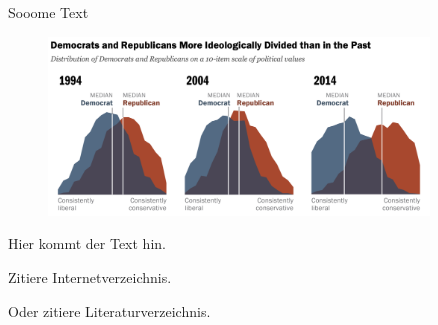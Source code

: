Sooome Text

	\begin{figure}[ht]
		\centering
		\includegraphics[width=0.9\textwidth]{images/Kapitel1/PoliticalPolarization}
	\end{figure}
	


Hier kommt der Text hin.

Zitiere  Internetverzeichnis.

Oder zitiere  Literaturverzeichnis.
